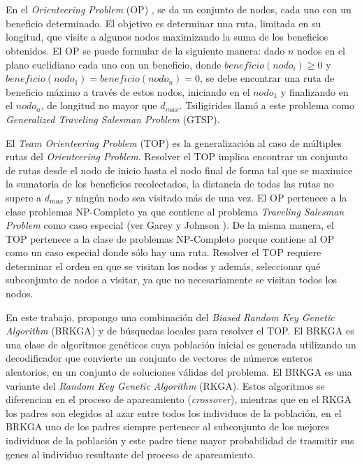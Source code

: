
\chapter*{\tituloAbstractEs}

\noindent En el \textit{Orienteering Problem} (OP) \cite{Tsiligirides}, se da un conjunto de nodos, cada uno con un beneficio determinado. El objetivo es determinar una ruta, limitada en su longitud, que visite a algunos nodos maximizando la suma de los beneficios obtenidos. El OP se puede formular de la siguiente manera: dado $n$ nodos en el plano euclidiano cada uno con un beneficio, donde $beneficio(nodo_i) \geq 0$ y $beneficio(nodo_1) = beneficio(nodo_n) = 0$, se debe encontrar una ruta de beneficio máximo a través de estos nodos, iniciando en el $nodo_1$ y finalizando en el $nodo_n$, de longitud no mayor que $d_{max}$. Tsiligirides \cite{Tsiligirides} llamó a este problema como \textit{Generalized Traveling Salesman Problem} (GTSP).

\bigskip

El \textit{Team Orienteering Problem} (TOP) \cite{ChaoGoldenWasil} es la generalización al caso de múltiples rutas del \textit{Orienteering Problem}. Resolver el TOP implica encontrar un conjunto de rutas desde el nodo de inicio hasta el nodo final de forma tal que se maximice la sumatoria de los beneficios recolectados, la distancia de todas las rutas no supere a $d_{max}$ y ningún nodo sea visitado más de una vez. El OP pertenece a la clase problemas NP-Completo ya que contiene al problema \textit{Traveling Salesman Problem} como caso especial (ver Garey y Johnson \cite{GareyJohnson}). De la misma manera, el TOP pertenece a la clase de problemas NP-Completo porque contiene al OP como un caso especial donde sólo hay una ruta. Resolver el TOP requiere determinar el orden en que se visitan los nodos y además, seleccionar qué subconjunto de nodos a visitar, ya que no necesariamente se visitan todos los nodos.

\bigskip

En este trabajo, propongo una combinación del \textit{Biased Random Key Genetic Algorithm} (BRKGA) \cite{Bean} y de búsquedas locales para resolver el TOP. El BRKGA es una clase de algoritmos genéticos cuya población inicial es generada utilizando un decodificador que convierte un conjunto de vectores de números enteros aleatorios, en un conjunto de soluciones válidas del problema. El BRKGA es una variante del \textit{Random Key Genetic Algorithm} (RKGA). Estos algoritmos se diferencian en el proceso de apareamiento (\textit{crossover}), mientras que en el RKGA los padres son elegidos al azar entre todos los individuos de la población, en el BRKGA uno de los padres siempre pertenece al subconjunto de los mejores individuos de la población y este padre tiene mayor probabilidad de trasmitir sus genes al individuo resultante del proceso de apareamiento.

